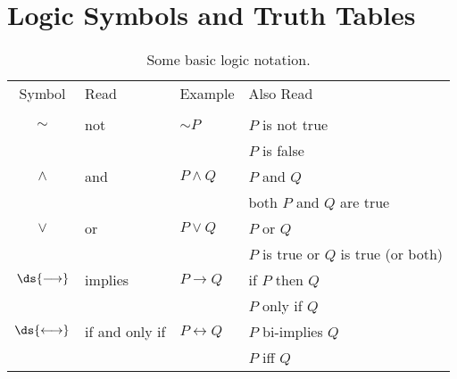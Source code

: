 %


\section[Logic Symbols and Truth Tables]{Logic Symbols and Truth Tables}

\begin{table}

\begin{center}\begin{tabular}{|c|l|l|l|}
\hline
Symbol &Read &Example &Also Read\\
&&&\\
\hline
$\sim$&not&$\sim P$&$P$ is not true\\
&&&$P$ is false\\ 
\hline
$\wedge$&and&$P\wedge Q$&$P$ and $Q$
\\ &&&both $P$ and $Q$ are true\\
\hline
$\vee$&or&$P\vee Q$&$P$ or $Q$  \\
&&&$P$ is true  or $Q$ is true (or both)\\ 
\hline

$\ds{\longrightarrow}$ &implies &$P\longrightarrow Q$
&if $P$ then $Q$\\ 
&&&$P$ only if $Q$\\
\hline
$\ds{\longleftrightarrow}$ & if and only if   
        &$P\longleftrightarrow Q$ &$P$ bi-implies $Q$\\
&&&$P$ iff $Q$\\
%
\hline\end{tabular}\end{center}
\caption{Some basic logic notation.}
\label{logicnotation}\end{table}



